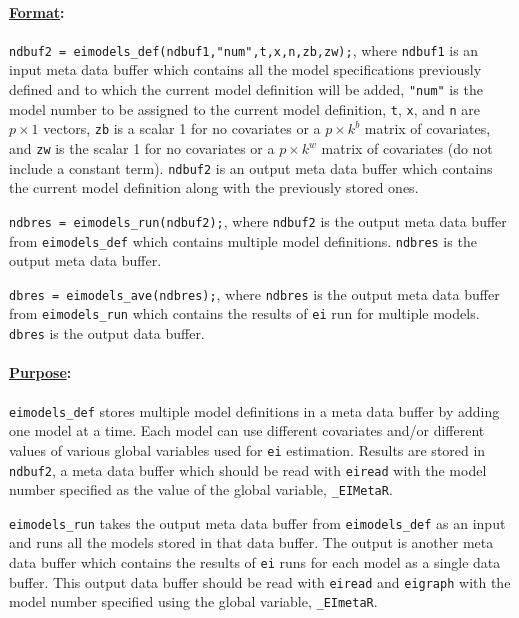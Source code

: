 \documentclass[11pt,titlepage]{article}
\begin{document}
\paragraph{\underline{Format}:} 
\texttt{ndbuf2 = eimodels\_def(ndbuf1,"num",t,x,n,zb,zw);}, where
\texttt{ndbuf1} is an input meta data buffer which contains all the model
specifications previously defined and to which the current model
definition will be added, \texttt{"num"} is the model number to be
assigned to the current model definition, \texttt{t}, \texttt{x}, and
\texttt{n} are $p\times 1$ vectors, \texttt{zb} is a scalar 1 for no
covariates or a $p\times k^b$ matrix of covariates, and \texttt{zw} is
the scalar 1 for no covariates or a $p\times k^w$ matrix of covariates
(do not include a constant term).  \texttt{ndbuf2} is an output meta data
buffer which contains the current model definition along with the
previously stored ones.

\texttt{ndbres = eimodels\_run(ndbuf2);}, where \texttt{ndbuf2} is the
output meta data buffer from \texttt{eimodels\_def} which contains
multiple model definitions. \texttt{ndbres} is the output meta data buffer.

\texttt{dbres = eimodels\_ave(ndbres);}, where \texttt{ndbres} is the
output meta data buffer from \texttt{eimodels\_run} which contains the
results of \texttt{ei} run for multiple models. \texttt{dbres} is the
output data buffer.

\paragraph{\underline{Purpose}:}
\texttt{eimodels\_def} stores multiple model definitions in a meta
data buffer by adding one model at a time. Each model can use
different covariates and/or different values of various global
variables used for \texttt{ei} estimation. Results are stored in
\texttt{ndbuf2}, a meta data buffer which should be read with
\texttt{eiread} with the model number specified as the value of the
global variable, \texttt{\_EIMetaR}.

\texttt{eimodels\_run} takes the output meta data buffer from
\texttt{eimodels\_def} as an input and runs all the models stored in
that data buffer. The output is another meta data buffer which
contains the results of \texttt{ei} runs for each model as a single
data buffer. This output data buffer should be read with
\texttt{eiread} and \texttt{eigraph} with the model number specified
using the global variable, \texttt{\_EImetaR}.
\end{document}
